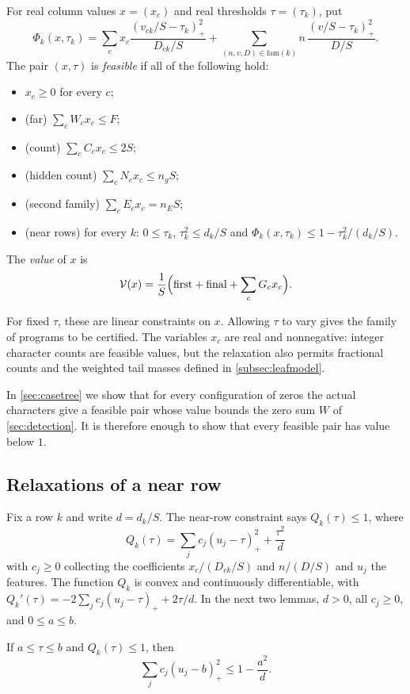 \documentclass[11pt]{amsart}
\numberwithin{equation}{section}
\theoremstyle{plain}
\theoremstyle{definition}
\theoremstyle{remark}
\newcommand{\1}{\mathbf{1}}
\begin{document}
\begin{definition}\label{def:leafprogram}
For real column values $x=(x_c)$ and real thresholds $\tau=(\tau_k)$, put
\[
  \Phi_k(x,\tau_k)=\sum_c x_c\frac{(v_{ck}/S-\tau_k)_+^2}{D_{ck}/S}
  +\sum_{(n,v,D)\in\mathrm{fam}(k)} n\,\frac{(v/S-\tau_k)_+^2}{D/S}.
\]
The pair $(x,\tau)$ is \emph{feasible} if all of the following hold:
\begin{itemize}
  \item $x_c\ge0$ for every $c$;
  \item (far) $\sum_cW_cx_c\le F$;
  \item (count) $\sum_cC_cx_c\le2S$;
  \item (hidden count) $\sum_cN_cx_c\le n_gS$;
  \item (second family) $\sum_cE_cx_c=n_ES$;
  \item (near rows) for every $k$: $0\le\tau_k$, $\tau_k^2\le d_k/S$ and
    $\Phi_k(x,\tau_k)\le1-\tau_k^2/(d_k/S)$.
\end{itemize}
The \emph{value} of $x$ is
\[
  \mathcal{V}(x)=\frac1S\Bigl(\mathrm{first}+\mathrm{final}+\sum_cG_cx_c\Bigr).
\]
\end{definition}

For fixed $\tau$, these are linear constraints on $x$. Allowing $\tau$ to vary gives
the family of programs to be certified. The variables $x_c$ are real and nonnegative:
integer character counts are feasible values, but the relaxation also permits
fractional counts and the weighted tail masses defined in \cref{subsec:leafmodel}.

In \cref{sec:casetree} we show that for every configuration of zeros the actual characters give a
feasible pair whose value bounds the zero sum $W$ of \cref{sec:detection}. It is therefore enough
to show that every feasible pair has value below $1$.

\subsection{Relaxations of a near row}
Fix a row $k$ and write $d=d_k/S$. The near-row constraint says
$Q_k(\tau)\le1$, where
\[
  Q_k(\tau)=\sum_jc_j(u_j-\tau)_+^2+\frac{\tau^2}{d}
\]
with $c_j\ge0$ collecting the coefficients $x_c/(D_{ck}/S)$ and $n/(D/S)$ and $u_j$ the features.
The function $Q_k$ is convex and continuously differentiable, with
$Q_k'(\tau)=-2\sum_jc_j(u_j-\tau)_++2\tau/d$. In the next two lemmas, $d>0$, all
$c_j\ge0$, and $0\le a\le b$.

\begin{lemma}\label{lem:firstorder}
If $a\le\tau\le b$ and $Q_k(\tau)\le1$, then
\[
  \sum_jc_j(u_j-b)_+^2\le1-\frac{a^2}{d}.
\]
\end{lemma}
\end{document}
